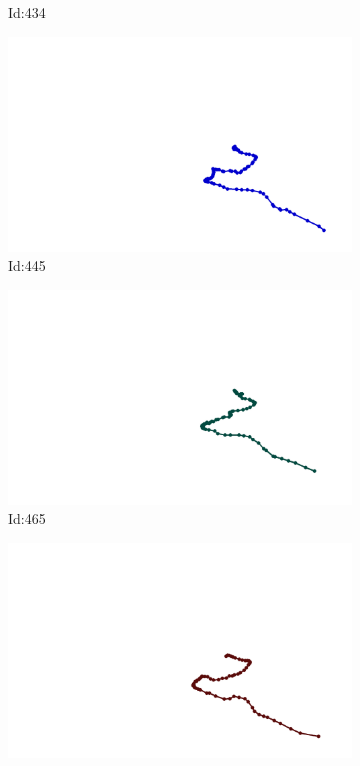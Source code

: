 \documentclass[12pt,twoside]{report}
\begin{document}
\begin{figure}
\begin{subfigure}[b]{0.20\textwidth}
\caption{Id:434}
\end{subfigure}
\begin{subfigure}[b]{0.20\textwidth}
\centering
\includegraphics[width=\textwidth]{../../trajectories/445.png}
\caption{Id:445}
\end{subfigure}
\begin{subfigure}[b]{0.20\textwidth}
\centering
\includegraphics[width=\textwidth]{../../trajectories/465.png}
\caption{Id:465}
\end{subfigure}
\begin{subfigure}[b]{0.20\textwidth}
\centering
\includegraphics[width=\textwidth]{../../trajectories/680.png}

\end{subfigure}
\end{figure}
\end{document}
